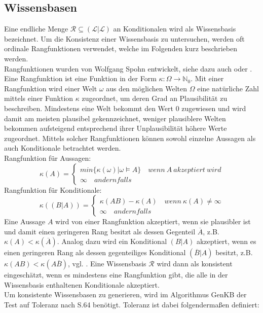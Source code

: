 \documentclass[12pt,a4paper]{article}
\newcommand{\lag}{\mathcal{L}}
\begin{document}
\subsection{Wissensbasen}
\label{sec:wissensbasen}
Eine endliche Menge $\mathcal{R} \subseteq (\lag | \lag)$ an Konditionalen wird als Wissensbasis bezeichnet. Um die Konsistenz einer Wissensbasis zu untersuchen, werden oft ordinale Rangfunktionen verwendet, welche im Folgenden kurz beschrieben werden. \\
Rangfunktionen wurden von Wolfgang Spohn entwickelt, siehe dazu auch \cite{spohn88} oder \cite{spohn12}. Eine Rangfunktion ist eine Funktion in der Form $\kappa :  \Omega \rightarrow \mathbb{N}_0 $. Mit einer Rangfunktion wird einer Welt $\omega$ aus den möglichen Welten $\Omega$ eine natürliche Zahl mittels einer Funktion $\kappa$ zugeordnet, um deren Grad an Plausibilität zu beschreiben. Mindestens eine Welt bekommt den Wert 0 zugewiesen und wird damit am meisten plausibel gekennzeichnet, weniger plausiblere Welten bekommen aufsteigend entsprechend ihrer Unplausibilität höhere Werte zugeordnet. Mittels solcher Rangfunktionen können sowohl einzelne Aussagen als auch Konditionale betrachtet werden.\\
Rangfunktion für Aussagen:
\[
 \kappa(A)=\begin{cases}
			min\{\kappa(\omega)|\omega \models A \} \quad wenn \  A \ akzeptiert \ wird \\
			\infty \quad andernfalls
            \end{cases}
\]
Rangfunktion für Konditionale:
\[
\kappa((B|A))=\begin{cases}
			\kappa(AB) - \kappa(A) \quad wenn \ \kappa(A) \neq \infty \\
			\infty \quad andernfalls
            \end{cases}
\]
Eine Aussage $A$ wird von einer Rangfunktion akzeptiert, wenn sie plausibler ist und damit einen geringeren Rang besitzt als dessen Gegenteil $\overline{A}$, z.B. $\kappa(A) < \kappa(\overline{A})$. Analog dazu wird ein Konditional $(B|A)$ akzeptiert, wenn es einen geringeren Rang als dessen gegenteiliges Konditional $(\overline{B}|A)$ besitzt, z.B. $\kappa(AB)<\kappa(A\overline{B})$, vgl. \cite{beierle17}. Eine Wissensbasis $\mathcal{R}$ wird dann als konsistent eingeschätzt, wenn es mindestens eine Rangfunktion gibt, die alle in der Wissensbasis enthaltenen Konditionale akzeptiert.\\
Um konsistente Wissensbasen zu generieren, wird im Algorithmus GenKB der Test auf Toleranz nach \cite{goldszmidt96}S.64 benötigt. Toleranz ist dabei folgendermaßen definiert:
\end{document}
